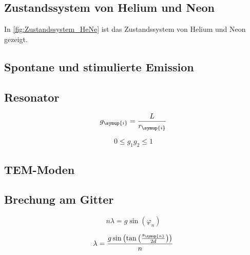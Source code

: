 \subsection{Zustandssystem von Helium und Neon}
In \autoref{fig:Zustandssystem_HeNe} ist das Zustandssystem von Helium und Neon gezeigt. 

\subsection{Spontane und stimulierte Emission}

\subsection{Resonator}

\begin{equation}
    g_{\symup{i}} = \frac{L}{r_{\symup{i}}}
    \label{eq:g_i}
\end{equation}

\begin{equation}
    0 ≤ g_1g_2 ≤ 1
    \label{eq:g1g2}
\end{equation}

\subsection{TEM-Moden}

\subsection{Brechung am Gitter}

\begin{equation}
    n \lambda = g \sin(\varphi_n)
    \label{eq:Interferenzbedingung}
\end{equation}

\begin{equation}
    \lambda = \frac{g\sin\left(\tan\left(\frac{s_{\symup{n}}}{2d}\right)\right)}{n}
    \label{eq:lambda}
\end{equation}